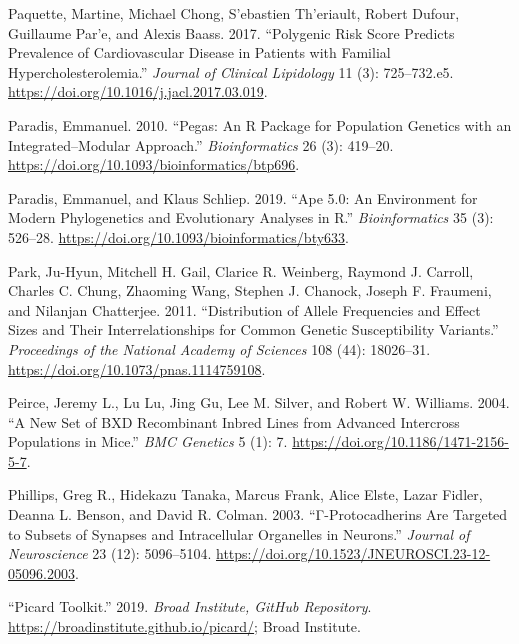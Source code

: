 \documentclass[
]{book}
\newlength{\cslhangindent}
\newlength{\cslentryspacingunit} %
\newenvironment{CSLReferences}[2] %
 {%
  \setlength{\parindent}{0pt}
  \ifodd #1
  \let\oldpar\par
  \def\par{\hangindent=\cslhangindent\oldpar}
  \fi
  \setlength{\parskip}{#2\cslentryspacingunit}
 }%
 {}
\begin{document}
\begin{CSLReferences}{1}{0}
\leavevmode{}%
Paquette, Martine, Michael Chong, S'ebastien Th'eriault, Robert Dufour, Guillaume Par'e, and Alexis Baass. 2017. {``Polygenic Risk Score Predicts Prevalence of Cardiovascular Disease in Patients with Familial Hypercholesterolemia.''} \emph{Journal of Clinical Lipidology} 11 (3): 725--732.e5. \url{https://doi.org/10.1016/j.jacl.2017.03.019}.

\leavevmode{}%
Paradis, Emmanuel. 2010. {``Pegas: An {R} Package for Population Genetics with an Integrated--Modular Approach.''} \emph{Bioinformatics} 26 (3): 419--20. \url{https://doi.org/10.1093/bioinformatics/btp696}.

\leavevmode{}%
Paradis, Emmanuel, and Klaus Schliep. 2019. {``Ape 5.0: An Environment for Modern Phylogenetics and Evolutionary Analyses in {R}.''} \emph{Bioinformatics} 35 (3): 526--28. \url{https://doi.org/10.1093/bioinformatics/bty633}.

\leavevmode{}%
Park, Ju-Hyun, Mitchell H. Gail, Clarice R. Weinberg, Raymond J. Carroll, Charles C. Chung, Zhaoming Wang, Stephen J. Chanock, Joseph F. Fraumeni, and Nilanjan Chatterjee. 2011. {``Distribution of Allele Frequencies and Effect Sizes and Their Interrelationships for Common Genetic Susceptibility Variants.''} \emph{Proceedings of the National Academy of Sciences} 108 (44): 18026--31. \url{https://doi.org/10.1073/pnas.1114759108}.

\leavevmode{}%
Peirce, Jeremy L., Lu Lu, Jing Gu, Lee M. Silver, and Robert W. Williams. 2004. {``A New Set of {BXD} Recombinant Inbred Lines from Advanced Intercross Populations in Mice.''} \emph{BMC Genetics} 5 (1): 7. \url{https://doi.org/10.1186/1471-2156-5-7}.

\leavevmode{}%
Phillips, Greg R., Hidekazu Tanaka, Marcus Frank, Alice Elste, Lazar Fidler, Deanna L. Benson, and David R. Colman. 2003. {``Γ-{Protocadherins Are Targeted} to {Subsets} of {Synapses} and {Intracellular Organelles} in {Neurons}.''} \emph{Journal of Neuroscience} 23 (12): 5096--5104. \url{https://doi.org/10.1523/JNEUROSCI.23-12-05096.2003}.

\leavevmode{}%
{``Picard Toolkit.''} 2019. \emph{Broad Institute, GitHub Repository}. \url{https://broadinstitute.github.io/picard/}; Broad Institute.


\end{CSLReferences}
\end{document}
